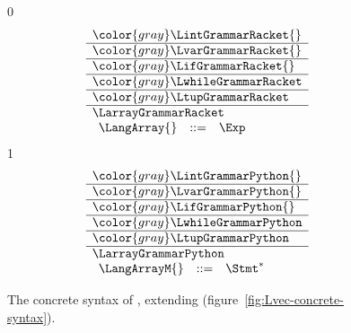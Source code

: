 \documentclass[7x10]{TimesAPriori_MIT}%
\newcommand{\gray}[1]{{\color{gray} #1}}
\def\racketEd{0}
\def\pythonEd{1}
\def\edition{1}
\newcommand{\pythonColor}[0]{}
\numberwithin{theorem}{chapter}
\numberwithin{definition}{chapter}
\numberwithin{equation}{chapter}
\begin{document}
\begin{figure}[tp]
\centering
\begin{tcolorbox}[colback=white]
    \small
{\if\edition\racketEd    
\[
\begin{array}{l}
  \gray{\LintGrammarRacket{}} \\ \hline
  \gray{\LvarGrammarRacket{}} \\ \hline
  \gray{\LifGrammarRacket{}} \\ \hline
  \gray{\LwhileGrammarRacket} \\ \hline
  \gray{\LtupGrammarRacket} \\ \hline
  \LarrayGrammarRacket \\
\begin{array}{lcl}
  \LangArray{} &::=& \Exp
\end{array}
\end{array}
\]
\fi}
{\if\edition\pythonEd\pythonColor    
\[
\begin{array}{l}
  \gray{\LintGrammarPython{}} \\ \hline
  \gray{\LvarGrammarPython{}} \\ \hline
  \gray{\LifGrammarPython{}} \\ \hline
  \gray{\LwhileGrammarPython} \\ \hline
  \gray{\LtupGrammarPython} \\ \hline
  \LarrayGrammarPython \\
\begin{array}{rcl}
  \LangArrayM{} &::=& \Stmt^{*}
\end{array}
\end{array}
\]
\fi}
\end{tcolorbox}
\caption{The concrete syntax of \LangArray{}, extending \LangVec{} (figure~\ref{fig:Lvec-concrete-syntax}).}
\label{fig:Lvecof-concrete-syntax}
\end{figure}
\end{document}
